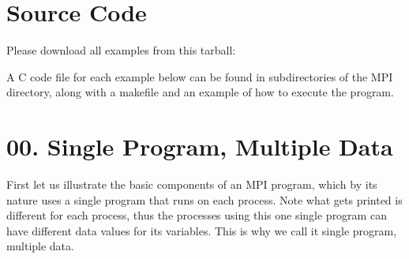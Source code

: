 \documentclass[letterpaper,10pt,openany,oneside]{sphinxmanual}
\begin{document}
\section{Source Code}
\label{MessagePassing/MPI_Patternlets:source-code}
Please download all examples from this tarball:

A C code file for each example below can be found in subdirectories of the MPI directory,
along with a makefile and an example of how to execute the program.


\section{00. Single Program, Multiple Data}
\label{MessagePassing/MPI_Patternlets:single-program-multiple-data}
First let us illustrate the basic components of an MPI program,
which by its nature uses a single program that runs on each process.
Note what gets printed is different for each process, thus the
processes using this one single program can have different data values
for its variables.  This is why we call it single program, multiple data.
\end{document}
